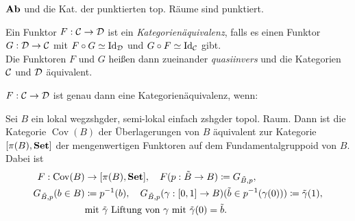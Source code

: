 \documentclass{cheat-sheet}
\DeclareMathOperator{\Cov}{Cov} %
\begin{document}
\begin{bspe}
  $\mathbf{Ab}$ und die Kat. der punktierten top. Räume sind punktiert.
\end{bspe}




\begin{defn}
  Ein Funktor $F : \mathcal{C} \to \mathcal{D}$ ist ein \emph{Kategorienäquivalenz}, falls es einen Funktor $G : \mathcal{D} \to \mathcal{C}$ mit $F \circ G \simeq \operatorname{Id}_{\mathcal{D}}$ und $G \circ F \simeq \operatorname{Id}_{\mathcal{C}}$ gibt. \\
  Die Funktoren $F$ und $G$ heißen dann zueinander \emph{quasiinvers} und die Kategorien $\mathcal{C}$ und $\mathcal{D}$ äquivalent.
\end{defn}


\begin{prop}
  $F : \mathcal{C} \to \mathcal{D}$ ist genau dann eine Kategorienäquivalenz, wenn:
   \quad
\end{prop}


\begin{bsp}
  Sei $B$ ein lokal wegzshgder, semi-lokal einfach zshgder topol. Raum. Dann ist die Kategorie $\Cov(B)$ der Überlagerungen von $B$ äquivalent zur Kategorie $[\pi(B), \mathbf{Set}]$ der mengenwertigen Funktoren auf dem Fundamentalgruppoid von $B$. Dabei ist
  \begin{align*}
    F : \Cov(B) & \to [\pi(B), \SetC], \quad F(p : \tilde{B} \to B) \coloneqq G_{\tilde{B},p}, \\
    G_{\tilde{B},p}(b \in B) & \coloneqq p^{-1}(b), \quad G_{\tilde{B},p}(\gamma : \I \to B)(\tilde{b} \in p^{-1}(\gamma(0))) \coloneqq \tilde{\gamma}(1), \\
    & \text{mit $\tilde{\gamma}$ Liftung von $\gamma$ mit $\tilde{\gamma}(0) = \tilde{b}$}.
  \end{align*}
\end{bsp}

\end{document}
